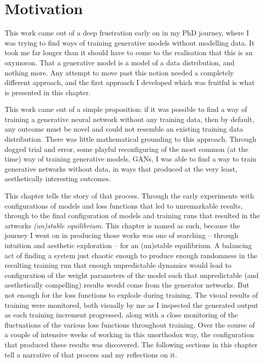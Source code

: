 \section{Motivation}

This work came out of a deep frustration early on in my PhD journey, where I was trying to find ways of training generative models without modelling data.
It took me far longer than it should have to come to the realisation that this is an oxymoron. 
That a generative model is a model of a data distribution, and nothing more. 
Any attempt to move past this notion needed a completely different approach, and the first approach I developed which was fruitful is what is presented in this chapter. 

This work came out of a simple proposition: if it was possible to find a way of training a generative neural network without any training data, then by default, any outcome must be novel and could not resemble an existing training data distribution. 
There was little mathematical grounding to this approach. 
Through dogged trial and error, some playful reconfiguring of the most common (at the time) way of training generative models, GANs, I was able to find a way to train generative networks without data, in ways that produced at the very least, aesthetically interesting outcomes. 

This chapter tells the story of that process. 
Through the early experiments with configurations of models and loss functions that led to unremarkable results, through to the final configuration of models and training runs that resulted in the artworks \textit{(un)stable equilibrium}.
This chapter is named as such, because the journey I went on in producing those works was one of searching -- through intuition and aesthetic exploration -- for an (un)stable equilibrium. 
A balancing act of finding a system just chaotic enough to produce enough randomness in the resulting training run that enough unpredictable dynamics would lead to configuration of the weight parameters of the model such that unpredictable (and aesthetically compelling) results would come from the generator networks. 
But not enough for the loss functions to explode during training. 
The visual results of training were monitored, both visually by me as I inspected the generated output as each training increment progressed, along with a close monitoring of the fluctuations of the various loss functions throughout training. 
Over the course of a couple of intensive weeks of working in this unorthodox way, the configuration that produced these results was discovered. 
The following sections in this chapter tell a narrative of that process and my reflections on it. 

